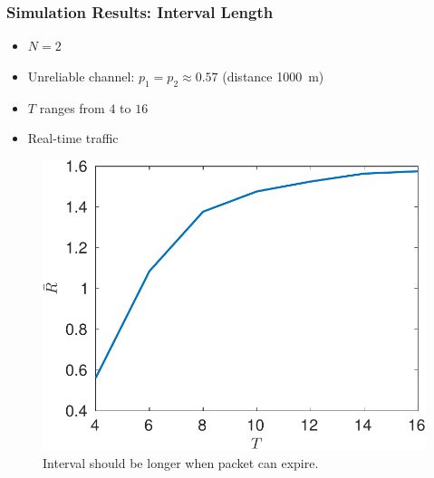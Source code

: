\documentclass{beamer}
\begin{document}
\begin{frame}
\frametitle{Simulation Results: Interval Length}
\begin{itemize}
\item $N=2$
\item Unreliable channel: $p_1 = p_2 \approx 0.57$ (distance \SI{1000}{m})
\item $T$ ranges from $4$ to $16$
\item Real-time traffic
\end{itemize}
\begin{figure}[htbp]
  \centering
  \includegraphics[height=.5\textheight]{realtime_throughput_T.pdf}
  \caption{Interval should be longer when packet can expire.}
\end{figure}
\end{frame}
\end{document}

